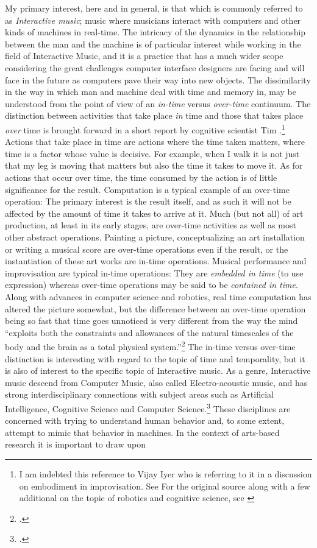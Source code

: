 My primary interest, here and in general, is that which is commonly referred to as \emph{Interactive   music}; music where musicians interact with computers and other kinds of machines in real-time. The intricacy of the dynamics in the relationship between the man and the machine is of particular interest while working in the field of Interactive Music, and it is a practice that has a much wider scope considering the great challenges computer interface designers are facing and will face in the future as computers pave their way into new objects. The dissimilarity in the way in which man and machine deal with time and memory in, may be understood from the point of view of an \emph{in-time} versus \emph{over-time} continuum. The distinction between activities that take place \emph{in} time and those that takes place \emph{over} time is brought forward in a short report by cognitive scientist Tim \citeauthor{smithers96}.\footnote{I am indebted this reference to Vijay Iyer who is referring to it in a discussion on embodiment in improvisation. See \cite{iyer08} For the original source along with a few additional on the topic of robotics and cognitive science, see \cite[See][]{smithers96,vangelder98,smithers:98}} Actions that take place in time are actions where the time taken matters, where time is a factor whose value is decisive. For example, when I walk it is not just that my leg is moving that matters but also the time it takes to move it. As for actions that occur over time, the time consumed by the action is of little significance for the result. Computation is a typical example of an over-time operation: The primary interest is the result itself, and as such it will not be affected by the amount of time it takes to arrive at it. Much (but not all) of art production, at least in its early stages, are over-time activities as well as most other abstract operations. Painting a picture, conceptualizing an art installation or writing a musical score are over-time operations even if the result, or the instantiation of these art works are in-time operations. Musical performance and improvisation are typical in-time operations: They are \emph{embedded in time} (to use \citeauthor{smithers96} expression) whereas over-time operations may be said to be \emph{contained in time}. Along with advances in computer science and robotics, real time computation has altered the picture somewhat, but the difference between an over-time operation being so fast that time goes unnoticed is very different from the way the mind ``exploits both the constraints and allowances of the natural timescales of the body and the brain as a total physical system.''\footcite[276]{iyer08} The in-time versus over-time distinction is interesting with regard to the topic of time and temporality, but it is also of interest to the specific topic of Interactive music. As a genre, Interactive music descend from Computer Music, also called Electro-acoustic music, and has strong interdisciplinary connections with subject areas such as Artificial Intelligence, Cognitive Science and Computer Science.\footcite[24]{moore90} These disciplines are concerned with trying to understand human behavior and, to some extent, attempt to mimic that behavior in machines. In the context of arts-based research it is important to draw upon 